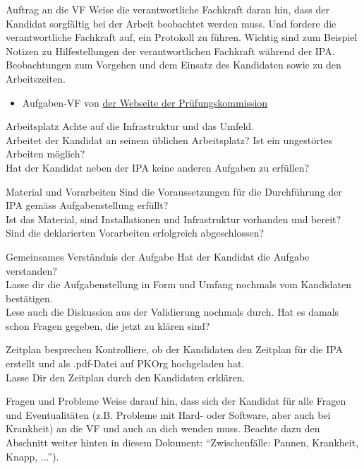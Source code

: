 \begin{taskitemwithoutcomment}{Auftrag an die VF}
  Weise die verantwortliche Fachkraft daran hin, dass der Kandidat sorgfältig bei der Arbeit beobachtet werden muss. Und fordere die verantwortliche Fachkraft auf, ein Protokoll zu führen. Wichtig sind zum Beispiel Notizen zu Hilfestellungen der verantwortlichen Fachkraft während der IPA. Beobachtungen zum Vorgehen und dem Einsatz des Kandidaten sowie zu den Arbeitszeiten.
  \begin{itemize}
    \item Aufgaben-VF von \href{https://pk19.ch}{der Webseite der Prüfungskommission}
  \end{itemize}
\end{taskitemwithoutcomment}
\begin{taskitem}{Arbeitsplatz}
  Achte auf die Infrastruktur und das Umfeld.\\Arbeitet der Kandidat an seinem üblichen Arbeitsplatz? Ist ein ungestörtes Arbeiten möglich?\\Hat der Kandidat neben der IPA keine anderen Aufgaben zu erfüllen?
\end{taskitem}
\newpage
\begin{taskitemsmall}{Material und Vorarbeiten}
  Sind die Voraussetzungen für die Durchführung der IPA gemäss Aufgabenstellung erfüllt?\\Ist das Material, sind Installationen und Infrastruktur vorhanden und bereit?\\Sind die deklarierten Vorarbeiten erfolgreich abgeschlossen?
\end{taskitemsmall}
\begin{taskitemdoublelarge}{Gemeinsames Verständnis der Aufgabe}
  Hat der Kandidat die Aufgabe verstanden?\\Lasse dir die Aufgabenstellung in Form und Umfang nochmals vom Kandidaten bestätigen.\\Lese auch die Diskussion aus der Validierung nochmals durch. Hat es damals schon Fragen gegeben, die jetzt zu klären sind?
\end{taskitemdoublelarge}
\begin{taskitem}{Zeitplan besprechen}
  Kontrolliere, ob der Kandidaten den Zeitplan für die IPA erstellt und als .pdf-Datei auf PKOrg hochgeladen hat.\\Lasse Dir den Zeitplan durch den Kandidaten erklären.
\end{taskitem}
\newpage
\begin{taskitem}{Fragen und Probleme}
  Weise darauf hin, dass sich der Kandidat für alle Fragen und Eventualitäten (z.B. Probleme mit Hard- oder Software, aber auch bei Krankheit) an die VF und auch an dich wenden muss. Beachte dazu den Abschnitt weiter hinten in diesem Dokument: \enquote{Zwischenfälle: Pannen, Krankheit, Knapp, ...}).
\end{taskitem}
